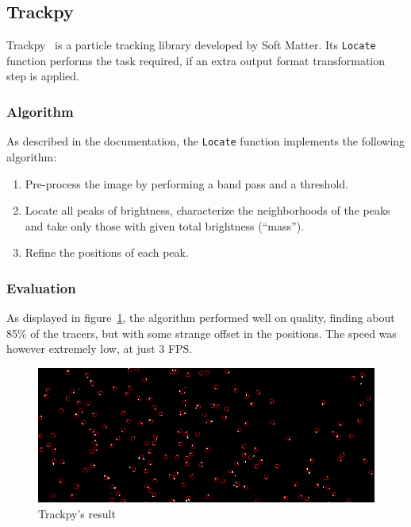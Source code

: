 \subsection{Trackpy}
\label{sec:locate:trackpy}

Trackpy~\cite{trackpy} is a particle tracking library developed by Soft Matter.
Its \texttt{Locate} function performs the task required, if an extra output format transformation step is applied.

\subsubsection{Algorithm}

As described in the documentation, the \texttt{Locate} function implements the following algorithm:
\begin{enumerate}
	\itemsep 0em
	\item Pre-process the image by performing a band pass and a threshold.
	\item Locate all peaks of brightness, characterize the neighborhoods of the peaks and take only those with given total brightness (``mass'').
	\item Refine the positions of each peak.
\end{enumerate}

\subsubsection{Evaluation}

As displayed in figure~\ref{fig:locate:trackpy}, the algorithm performed well on quality, finding about 85\% of the tracers, but with some strange offset in the positions.
The speed was however extremely low, at just 3 FPS.

\begin{figure}
	\centerline{\includegraphics[width=\locateimgsize]{images/locate/trackpy.png}}
	\caption{\centering Trackpy's result}
	\label{fig:locate:trackpy}
\end{figure}
